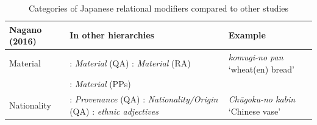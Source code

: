 \begin{table}[h]
\caption{Categories of Japanese relational modifiers compared to other studies}
\begin{tabularx}{\textwidth}{lQ@{}p{3cm}}
\lsptoprule
\textbf{Nagano (2016)} & \textbf{In other hierarchies} & \textbf{Example} \\
\midrule

Material & \citet{scott:2002:stacked, laenzlinger:2005:french, laenzlinger:2011:elements}: \textit{Material} (QA)\newline
\citet{rae:2010:ordering, bortolotto:2016:RA}: \textit{Material} (RA) & \textit{komugi-no pan} `wheat(en) bread' \\
& \citet{takamine:2010:hierarchy}: \textit{Material} (PPs) & \\
\tablevspace
Nationality & \citet{sproat:1991:the}: \textit{Provenance} (QA)\newline
 \citet{scott:2002:stacked, cinque:2010:adj, laenzlinger:2005:french, laenzlinger:2011:elements}: \textit{Nationality/Origin} (QA) \newline
\citet{alex:2011:ea, arseni:2014:EA}: \textit{ethnic adjectives} & \textit{Chūgoku-no kabin} `Chinese vase'  \\
\midrule
\end{tabularx}
\end{table}
\clearpage


